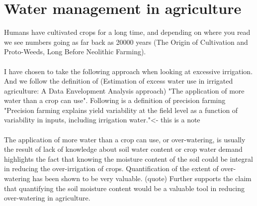 \documentclass[]{uiophd}
\begin{document}
\section{Water management in agriculture}
Humans have cultivated crops for a long time, and depending on where you read we see numbers going as far back as 20000 years (The Origin of Cultivation and Proto-Weeds, Long Before Neolithic Farming). 
\\\\
I have chosen to take the following approach when looking at excessive irrigation. And we follow the definition of (Estimation of excess water use in irrigated agriculture: A Data Envelopment Analysis approach) "The application of more water than a crop can use". Following is a definition of precision farming "Precision farming explains yield variability at the field level as a function of variability in inputs, including irrigation water."<- this is a note
\\\\

The application of more water than a crop can use, or over-watering, is usually the result of lack of knowledge about soil water content or crop water demand \parencite{LILIENFELD200773} highlights the fact that knowing the moisture content of the soil could be integral in reducing the over-irrigation of crops. Quantification of the extent of over-watering has been shown to be very valuable. (quote) Further supports the claim that quantifying the soil moisture content would be a valuable tool in reducing over-watering in agriculture.
\end{document}
